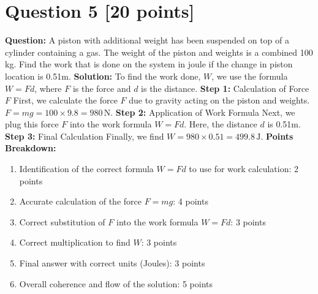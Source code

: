 \documentclass{article}
\begin{document}
\newpage
\section*{Question 5 [20 points]}
\textbf{Question:} A piston with additional weight has been suspended on top of a cylinder containing a gas. The weight of the piston and weights is a combined 100 kg. Find the work that is done on the system in joule if the change in piston location is 0.51m.
\newline \newline
\textbf{Solution:}
\newline
To find the work done, \( W \), we use the formula \( W = Fd \), where \( F \) is the force and \( d \) is the distance.
\newline \newline
\textbf{Step 1:} Calculation of Force \( F \) 
\newline
First, we calculate the force \( F \) due to gravity acting on the piston and weights. \( F = mg = 100 \times 9.8 = 980 \, \text{N} \).
\newline \newline
\textbf{Step 2:} Application of Work Formula
\newline
Next, we plug this force \( F \) into the work formula \( W = Fd \). Here, the distance \( d \) is 0.51m.
\newline  \newline
\textbf{Step 3:} Final Calculation
\newline
Finally, we find \( W = 980 \times 0.51 = 499.8 \, \text{J} \).
\newline \newline
\textbf{Points Breakdown:}
\begin{enumerate}
    \renewcommand{\labelenumi}{\alph{enumi})}
    \item Identification of the correct formula \( W = Fd \) to use for work calculation: 2 points
    \item Accurate calculation of the force \( F = mg \): 4 points
    \item Correct substitution of \( F \) into the work formula \( W = Fd \): 3 points
    \item Correct multiplication to find \( W \): 3 points
    \item Final answer with correct units (Joules): 3 points
    \item Overall coherence and flow of the solution: 5 points
\end{enumerate}
\end{document}
